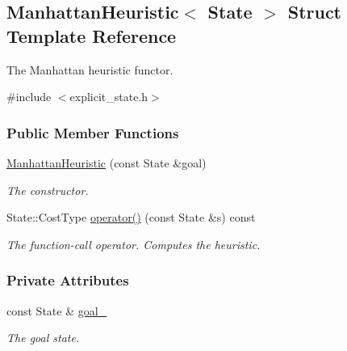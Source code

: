 \hypertarget{structManhattanHeuristic}{}\subsection{Manhattan\+Heuristic$<$ State $>$ Struct Template Reference}
\label{structManhattanHeuristic}


The Manhattan heuristic functor.  




{\ttfamily \#include $<$explicit\+\_\+state.\+h$>$}

\subsubsection*{Public Member Functions}
\begin{DoxyCompactItemize}
\item 
\hyperlink{structManhattanHeuristic_a2f7203dc67100a431aaf369dfa472943}{Manhattan\+Heuristic} (const State \&goal)
\begin{DoxyCompactList}\small\item\em The constructor. \end{DoxyCompactList}\item 
State\+::\+Cost\+Type \hyperlink{structManhattanHeuristic_a1cfe4757c15c5ae3d278f84b0659c178}{operator()} (const State \&s) const 
\begin{DoxyCompactList}\small\item\em The function-\/call operator. Computes the heuristic. \end{DoxyCompactList}\end{DoxyCompactItemize}
\subsubsection*{Private Attributes}
\begin{DoxyCompactItemize}
\item 
const State \& \hyperlink{structManhattanHeuristic_af4ee730dd41048e537946aca56e3098b}{goal\+\_\+}\hypertarget{structManhattanHeuristic_af4ee730dd41048e537946aca56e3098b}{}\label{structManhattanHeuristic_af4ee730dd41048e537946aca56e3098b}

\begin{DoxyCompactList}\small\item\em The goal state. \end{DoxyCompactList}\end{DoxyCompactItemize}


